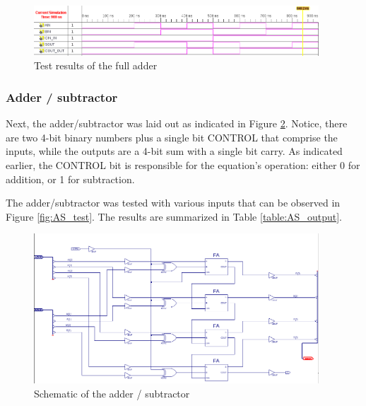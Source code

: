 \documentclass[11pt]{article}
\begin{document}
\begin{figure}[htpb]
	\centering
	\includegraphics[width=0.95\textwidth]{FA_test}
	\caption{Test results of the full adder}
	\label{fig:FA_test}
\end{figure}

\pagebreak
\subsubsection{Adder / subtractor}

Next, the adder/subtractor was laid out as indicated in Figure \ref{fig:AS_schematic}. Notice, there are two 4-bit binary numbers plus a single bit CONTROL that comprise the inputs, while the outputs are a 4-bit sum with a single bit carry. As indicated earlier, the CONTROL bit is responsible for the equation's operation: either 0 for addition, or 1 for subtraction. 

The adder/subtractor was tested with various inputs that can be observed in Figure \ref{fig:AS_test}. The results are summarized in Table \ref{table:AS_output}.

\begin{figure}[htpb]
	\centering
	\includegraphics[width=0.95\textwidth]{add_sub-schematic}
	\caption{Schematic of the adder / subtractor}
	\label{fig:AS_schematic}
\end{figure}
\end{document}
